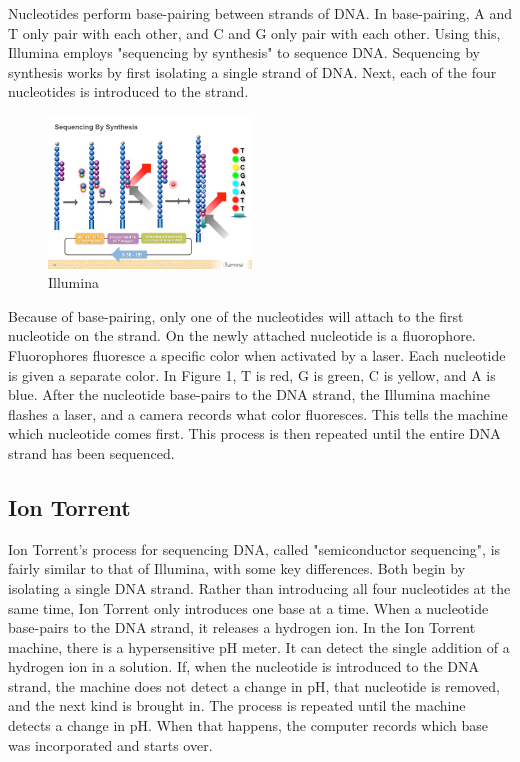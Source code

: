 \documentclass[12pt,letterpaper]{report}
\begin{document}
Nucleotides perform base-pairing between strands of DNA. In base-pairing, A and T only pair with each other, and C and G only pair with each other. Using this, Illumina employs "sequencing by synthesis" to sequence DNA. Sequencing by synthesis works by first isolating a single strand of DNA. Next, each of the four nucleotides is introduced to the strand. 
\begin{figure}
\vspace{-20pt}
  \begin{center}
    \includegraphics[width=0.48\textwidth]{illumina_fig.png}
  \end{center}
  \vspace{-20pt}
  \caption{Illumina}
  \vspace{-10pt}
  \label{fig:illumina}
\end{figure}
Because of base-pairing, only one of the nucleotides will attach to the first nucleotide on the strand. On the newly attached nucleotide is a fluorophore. Fluorophores fluoresce a specific color when activated by a laser. Each nucleotide is given a separate color. In Figure 1, T is red, G is green, C is yellow, and A is blue. After the nucleotide base-pairs to the DNA strand, the Illumina machine flashes a laser, and a camera records what color fluoresces. This tells the machine which nucleotide comes first. This process is then repeated until the entire DNA strand has been sequenced.

\subsection{Ion Torrent}

Ion Torrent's process for sequencing DNA, called "semiconductor sequencing", is fairly similar to that of Illumina, with some key differences. Both begin by isolating a single DNA strand. Rather than introducing all four nucleotides at the same time, Ion Torrent only introduces one base at a time. When a nucleotide base-pairs to the DNA strand, it releases a hydrogen ion. In the Ion Torrent machine, there is a hypersensitive pH meter. It can detect the single addition of a hydrogen ion in a solution. If, when the nucleotide is introduced to the DNA strand, the machine does not detect a change in pH, that nucleotide is removed, and the next kind is brought in. The process is repeated until the machine detects a change in pH. When that happens, the computer records which base was incorporated and starts over.
\clearpage
\end{document}
